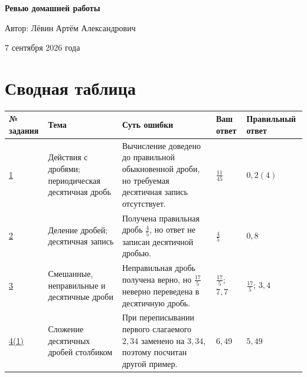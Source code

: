 \documentclass[12pt,a4paper]{article}
\begin{document}
\thispagestyle{empty}
\begin{center}
\vspace*{0.18\textheight}
{\LARGE\bfseries Ревью домашней работы\par}
\vspace{2.2cm}
{\large Автор: Лёвин Артём Александрович\par}
\vspace{0.8cm}
{\large 7 сентября 2026 года\par}
\vfill
{}
\vspace{1.0cm}
\end{center}

\newpage
\section*{Сводная таблица}
\small
\begin{center}
\begin{tabular}{@{}>{\centering\arraybackslash}p{14mm} p{29mm} p{49mm} p{30mm} p{30mm}@{}}
\toprule
\textbf{№ задания} & \textbf{Тема} & \textbf{Суть ошибки} & \textbf{Ваш ответ} & \textbf{Правильный ответ} \\
\midrule
\hyperref[task:1]{1} & Действия с дробями; периодическая десятичная дробь & Вычисление доведено до правильной обыкновенной дроби, но требуемая десятичная запись отсутствует. & $\frac{11}{45}$ & $0{,}2(4)$ \\
\addlinespace
\hyperref[task:2]{2} & Деление дробей; десятичная запись & Получена правильная дробь $\frac45$, но ответ не записан десятичной дробью. & $\frac45$ & $0{,}8$ \\
\addlinespace
\hyperref[task:3]{3} & Смешанные, неправильные и десятичные дроби & Неправильная дробь получена верно, но $\frac{17}{5}$ неверно переведена в десятичную дробь. & $\frac{17}{5}$; $7{,}7$ & $\frac{17}{5}$; $3{,}4$ \\
\addlinespace
\hyperref[task:4-1]{4(1)} & Сложение десятичных дробей столбиком & При переписывании первого слагаемого $2{,}34$ заменено на $3{,}34$, поэтому посчитан другой пример. & $6{,}49$ & $5{,}49$ \\
\bottomrule
\end{tabular}
\end{center}
\normalsize
\end{document}
